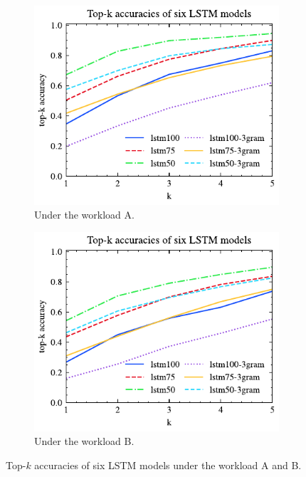 \begin{figure}[!th]
	\centering
	\begin{subfigure}{0.45\textwidth}
		\centering
%		
		\includegraphics[]{my/graphics/top_k_lstm_A.pdf}
		\caption{Under the workload A.}
		\label{fig:top_k_lstm_A}
	\end{subfigure}
	\hfill
	\begin{subfigure}{0.45\textwidth}
		\centering
		\includegraphics[]{my/graphics/top_k_lstm_B.pdf}
		\caption{Under the workload B.}
		\label{fig:top_k_lstm_B}
	\end{subfigure}
	\caption{Top-$k$ accuracies of six LSTM models under the workload A and B.}
	\label{fig:top_k_lstm_all}
\end{figure}
